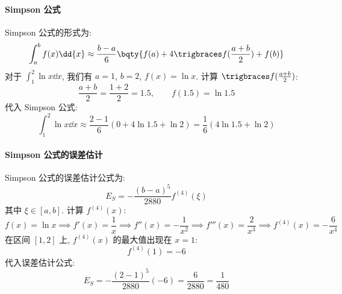 \documentclass[lang = zh]{iwork}
\begin{document}
\begin{sol}
  \paragraph{Simpson 公式}
  Simpson 公式的形式为:
  \begin{equation*}
    \int_a^b f(x) \dd{x} \approx \frac{b-a}{6} \bqty{f(a) + 4\f(\frac{a+b}{2}) + f(b)}
  \end{equation*}
  对于 $\int_1^2 \ln{x} \dd{x}$, 我们有 $a = 1$, $b = 2$, $f(x) = \ln{x}$.
  计算 $\f(\frac{a+b}{2})$:
  \begin{equation*}
    \frac{a+b}{2} = \frac{1+2}{2} = 1.5, \qquad
    f(1.5) = \ln{1.5}
  \end{equation*}
  代入 Simpson 公式:
  \begin{equation*}
    \int_1^2 \ln{x} \dd{x}
    \approx \frac{2-1}{6} (0 + 4 \ln{1.5} + \ln{2})
    = \frac{1}{6} (4 \ln{1.5} + \ln{2})
  \end{equation*}

  \paragraph{Simpson 公式的误差估计}
  Simpson 公式的误差估计公式为:
  \begin{equation*}
    E_S = -\frac{(b-a)^5}{2880} f^{(4)}(\xi)
  \end{equation*}
  其中 $\xi \in [a, b]$.
  计算 $f^{(4)}(x)$:
  \begin{equation*}
    f(x) = \ln{x}
    \implies f'(x) = \frac{1}{x}
    \implies f''(x) = -\frac{1}{x^2}
    \implies f'''(x) = \frac{2}{x^3}
    \implies f^{(4)}(x) = -\frac{6}{x^4}
  \end{equation*}
  在区间 $[1, 2]$ 上, $f^{(4)}(x)$ 的最大值出现在 $x = 1$:
  \begin{equation*}
    f^{(4)}(1) = -6
  \end{equation*}
  代入误差估计公式:
  \begin{equation*}
    E_S = -\frac{(2-1)^5}{2880} (-6) = \frac{6}{2880} = \frac{1}{480}
  \end{equation*}


\end{sol}
\end{document}
